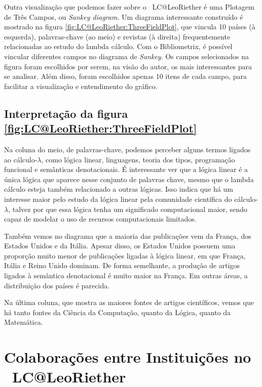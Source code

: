 Outra visualização que podemos fazer sobre o \dataset\  LC@LeoRiether é uma Plotagem de Três Campos, ou \textit{Sankey diagram}. Um diagrama interessante construído é mostrado na figura \ref{fig:LC@LeoRiether:ThreeFieldPlot}, que vincula 10 países (à esquerda), palavras-chave (ao meio) e revistas (à direita) frequentemente relacionadas ao estudo do lambda cálculo. Com o Bibliometrix, é possível vincular diferentes campos no diagrama de \textit{Sankey}. Os campos selecionados na figura foram escolhidos por serem, na visão do autor, os mais interessantes para se analisar. Além disso, foram escolhidos apenas 10 itens de cada campo, para facilitar a visualização e entendimento do gráfico.

\subsection{Interpretação da figura \ref{fig:LC@LeoRiether:ThreeFieldPlot}}
Na coluna do meio, de palavras-chave, podemos perceber alguns termos ligados ao cálculo-$\lambda$, como lógica linear, linguagens, teoria dos tipos, programação funcional e semânticas denotacionais. É interessante ver que a lógica linear é a única lógica que aparece nesse conjunto de palavras chave, mesmo que o lambda cálculo esteja também relacionado a outras lógicas. Isso indica que há um interesse maior pelo estudo da lógica linear pela comunidade científica do cálculo-$\lambda$, talvez por que essa lógica tenha um significado computacional maior, sendo capaz de modelar o uso de recursos computacionais limitados.

Também vemos no diagrama que a maioria das publicações vem da França, dos Estados Unidos e da Itália. Apesar disso, os Estados Unidos possuem uma proporção muito menor de publicações ligadas à lógica linear, em que França, Itália e Reino Unido dominam. De forma semelhante, a produção de artigos ligados à semântica denotacional é muito maior na França. Em outras áreas, a distribuição dos países é parecida.

Na última coluna, que mostra as maiores fontes de artigos científicos, vemos que há tanto fontes da Ciência da Computação, quanto da Lógica, quanto da Matemática.

\section{Colaborações entre Instituições no \dataset\  LC@LeoRiether}

